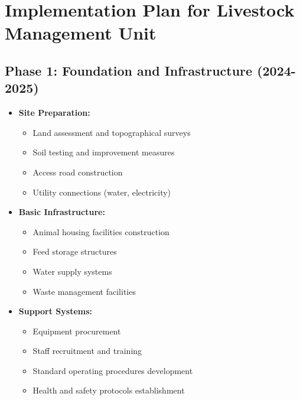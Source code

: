 \section{Implementation Plan for Livestock Management Unit}

\subsection{Phase 1: Foundation and Infrastructure (2024-2025)}
\begin{itemize}
    \item \textbf{Site Preparation:}
    \begin{itemize}
        \item Land assessment and topographical surveys
        \item Soil testing and improvement measures
        \item Access road construction
        \item Utility connections (water, electricity)
    \end{itemize}
    
    \item \textbf{Basic Infrastructure:}
    \begin{itemize}
        \item Animal housing facilities construction
        \item Feed storage structures
        \item Water supply systems
        \item Waste management facilities
    \end{itemize}
    
    \item \textbf{Support Systems:}
    \begin{itemize}
        \item Equipment procurement
        \item Staff recruitment and training
        \item Standard operating procedures development
        \item Health and safety protocols establishment
    \end{itemize}
\end{itemize}

